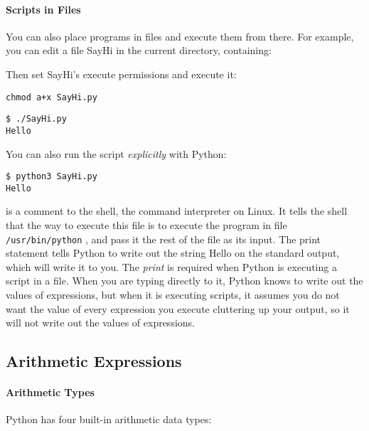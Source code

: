 \paragraph{Scripts in Files}

You can also place programs in
files and execute them from there. For example, you can edit a file
SayHi in the current directory, containing:

\resetlinenumber[1]
\linenumbers
\begin{tt}
  
\end{tt}
\nolinenumbers

Then set SayHi's execute permissions and execute it:

\begin{verbatim}
chmod a+x SayHi.py
\end{verbatim}

\begin{verbatim}
$ ./SayHi.py
Hello
\end{verbatim}

You can also run the script \emph{explicitly} with Python:

\begin{verbatim}
$ python3 SayHi.py
Hello
\end{verbatim}

is a comment to the shell, the command interpreter on Linux. It tells the
shell that the way to execute this file is to execute the program in
file \texttt{/usr/bin/python} , and pass it the rest of the file as its
input. The print statement tells Python to write out the string Hello on
the standard output, which will write it to you. The \emph{print} is
required when Python is executing a script in a file. When you are
typing directly to it, Python knows to write out the values of
expressions, but when it is executing scripts, it assumes you do not
want the value of every expression you execute cluttering up your
output, so it will not write out the values of expressions.

\subsection{Arithmetic Expressions}

\paragraph{Arithmetic Types}

Python has four built-in arithmetic data types:

